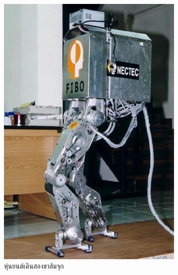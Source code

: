 \begin{figure}[!ht]
\begin{subfigure}[b]{0.3\textwidth}
        \includegraphics[width=\textwidth]{chapter2/images/ส้มจุก.jpg}
        \caption{หุ่นยนต์เดินสองขาส้มจุก}
        \label{fig:somjook}
    \end{subfigure}
    \hfill
    \begin{subfigure}[b]{0.3\textwidth}
        \centering

\end{subfigure}
\end{figure}
